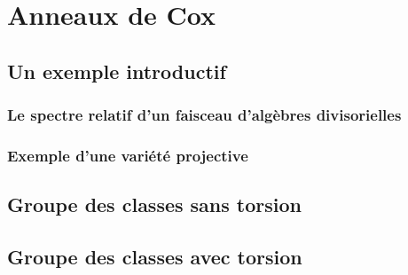 \chapter{Anneaux de Cox}

\section{Un exemple introductif}

\subsection{Le spectre relatif d'un faisceau d'algèbres divisorielles}

\subsection{Exemple d'une variété projective}


\section{Groupe des classes sans torsion}


\section{Groupe des classes avec torsion}
